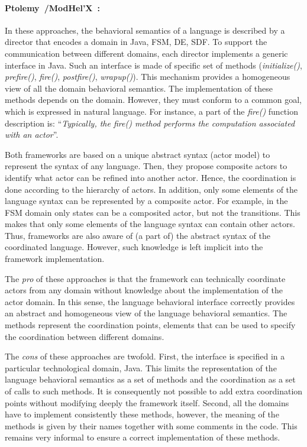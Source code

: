 \paragraph{Ptolemy~\cite{ptoleframebib}/ModHel'X~\cite{modhelxbib}:}
In these approaches, the behavioral semantics of a language is described by a director that encodes a domain in Java, \eg FSM, DE, SDF. To support the communication between different domains, each director implements a generic interface in Java. Such an interface is made of specific set of methods (\eg \emph{initialize()}, \emph{prefire()}, \emph{fire()}, \emph{postfire()}, \emph{wrapup()}). This mechanism provides a homogeneous view of all the domain behavioral semantics. The implementation of these methods depends on the domain. However, they must conform to a common goal, which is expressed in natural language. For instance, a part of the \emph{fire()} function description is: ``\emph{Typically, the fire() method performs the computation associated with an actor}''. 

Both frameworks are based on a unique abstract syntax (\ie actor model) to represent the syntax of any language. Then, they propose composite actors to identify what actor can be refined into another actor. Hence, the coordination is done according to the hierarchy of actors. In addition, only some elements of the language syntax can be represented by a composite actor. For example, in the FSM domain only states can be a composited actor, but not the transitions. This makes that only some elements of the language syntax can contain other actors. Thus, frameworks are also aware of (a part of) the abstract syntax of the coordinated language. However, such knowledge is left implicit into the framework implementation.

The \emph{pro} of these approaches is that the framework can technically coordinate actors from any domain without knowledge about the implementation of the actor domain. In this sense, the language behavioral interface correctly provides an abstract and homogeneous view of the language behavioral semantics. The methods represent the coordination points, \ie elements that can be used to specify the coordination between different domains. 

The \emph{cons} of these approaches are twofold. First, the interface is specified in a particular technological domain, \ie Java. This limits the representation of the language behavioral semantics as a set of methods and the coordination as a set of calls to such methods. It is consequently not possible to add extra coordination points without modifying deeply the framework itself. Second, all the domains have to implement consistently these methods, however, the meaning of the methods is given by their names together with some comments in the code. This remains very informal to ensure a correct implementation of these methods.  

